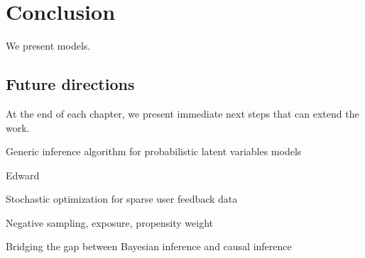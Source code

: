 
\chapter{Conclusion}

\PP We present models.

\section{Future directions}

\PP At the end of each chapter, we present immediate next steps that can extend the work. 

\PP Generic inference algorithm for probabilistic latent variables models

\PP Edward

\PP Stochastic optimization for sparse user feedback data

\PP Negative sampling, exposure, propensity weight

\PP Bridging the gap between Bayesian inference and causal inference
